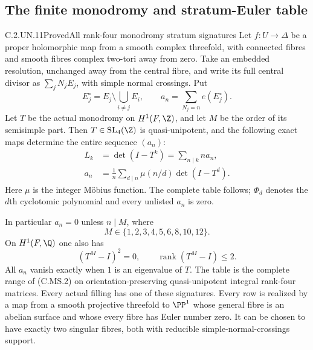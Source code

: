 \subsection{The finite monodromy and stratum-Euler table}

\begin{statement}{C.2.UN.11}{Proved}{All rank-four monodromy stratum signatures}
Let $f:U\to\Delta$ be a proper holomorphic map from a
smooth complex threefold, with connected fibres and
smooth fibres complex two-tori away from zero. Take
an embedded resolution, unchanged away from the
central fibre, and write its full central divisor as
$\sum_jN_jE_j$, with simple normal crossings. Put
\[
 E_j^\circ=E_j\setminus\bigcup_{i\ne j}E_i,
 \qquad a_n=\sum_{N_j=n}e(E_j^\circ).
 \tag{C.MS.1}
\]
Let $T$ be the actual monodromy on $H^1(F,\Z)$,
and let $M$ be the order of its semisimple part.
Then $T\in\operatorname{SL}_4(\Z)$ is
quasi-unipotent, and the following exact maps
determine the entire sequence $(a_n)$:
\[
 \begin{aligned}
 L_k&=\det(I-T^k)
       =\sum_{n\mid k}n a_n,\\
 a_n&=\frac1n\sum_{d\mid n}\mu(n/d)\det(I-T^d).
 \end{aligned}                                  \tag{C.MS.2}
\]
Here $\mu$ is the integer M\"obius function.
The complete table follows; $\Phi_d$ denotes
the $d$th cyclotomic polynomial and every
unlisted $a_n$ is zero.



In particular $a_n=0$ unless $n\mid M$, where
\[
                 M\in\{1,2,3,4,5,6,8,10,12\}.
 \tag{C.MS.3}
\]
On $H^1(F,\Q)$ one also has
\[
                  (T^M-I)^2=0,
                  \qquad\operatorname{rank}(T^M-I)\le2.
 \tag{C.MS.10}
\]
All $a_n$ vanish exactly when $1$ is an eigenvalue
of $T$. The table is the complete range of (C.MS.2)
on orientation-preserving quasi-unipotent integral
rank-four matrices. Every actual filling has one
of these signatures. Every row is realized by a
map from a smooth projective threefold to $\PP^1$
whose general fibre is an abelian surface and
whose every fibre has Euler number zero. It
can be chosen to have exactly two singular
fibres, both with reducible simple-normal-crossings
support.


\end{statement}
